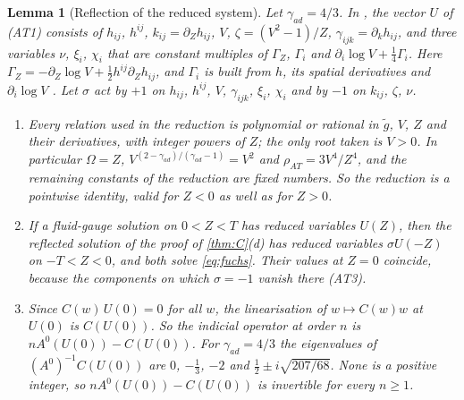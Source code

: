 \documentclass[11pt]{article}
\theoremstyle{canonmath}
\newtheorem{lemma}[theorem]{Lemma}
\theoremstyle{canonpostulate}
\theoremstyle{canonproposition}
\theoremstyle{canonmath}
\theoremstyle{canonproposition}
\def\mathrm#1{#1}%
\def\mathbf#1{#1}%
\begin{document}
\begin{lemma}[Reflection of the reduced system]\label{lem:ATreflect}
Let $\gamma_{\mathrm{ad}} = 4/3$. In \cite[§4.3]{AnguigeTod1999a}, the vector $\mathbf{U}$ of (AT1) consists of $h_{ij}$, $h^{ij}$, $k_{ij} = \partial_Zh_{ij}$, $V$, $\zeta = (V^2-1)/Z$, $\gamma_{ijk} = \partial_kh_{ij}$, and three variables $\nu$, $\xi_i$, $\chi_i$ that are constant multiples of $\Gamma_Z$, $\Gamma_i$ and $\partial_i\log V + \tfrac14\Gamma_i$. Here $\Gamma_Z = -\partial_Z\log V + \tfrac12h^{ij}\partial_Zh_{ij}$, and $\Gamma_i$ is built from $h$, its spatial derivatives and $\partial_i\log V$ \cite[(46), (47), (55)]{AnguigeTod1999a}. Let $\sigma$ act by $+1$ on $h_{ij}$, $h^{ij}$, $V$, $\gamma_{ijk}$, $\xi_i$, $\chi_i$ and by $-1$ on $k_{ij}$, $\zeta$, $\nu$.
\begin{enumerate}[label=(\roman*)]
\item Every relation used in the reduction is polynomial or rational in $\tilde g$, $V$, $Z$ and their derivatives, with integer powers of $Z$; the only root taken is $V>0$. In particular $\Omega = Z$, $V^{(2-\gamma_{\mathrm{ad}})/(\gamma_{\mathrm{ad}}-1)} = V^2$ and $\rho_{\mathrm{AT}} = 3V^4/Z^4$, and the remaining constants of the reduction are fixed numbers. So the reduction is a pointwise identity, valid for $Z<0$ as well as for $Z>0$.
\item If a fluid-gauge solution on $0<Z<T$ has reduced variables $\mathbf{U}(Z)$, then the reflected solution of the proof of \cref{thm:C}(d) has reduced variables $\sigma \mathbf{U}(-Z)$ on $-T<Z<0$, and both solve \eqref{eq:fuchs}. Their values at $Z = 0$ coincide, because the components on which $\sigma = -1$ vanish there (AT3).
\item Since $C(w)\,\mathbf{U}(0) = 0$ for all $w$, the linearisation of $w\mapsto C(w)w$ at $\mathbf{U}(0)$ is $C(\mathbf{U}(0))$. So the indicial operator at order $n$ is $nA^0(\mathbf{U}(0)) - C(\mathbf{U}(0))$. For $\gamma_{\mathrm{ad}} = 4/3$ the eigenvalues of $(A^0)^{-1}C(\mathbf{U}(0))$ are $0$, $-\tfrac13$, $-2$ and $\tfrac12\pm i\sqrt{207/68}$. None is a positive integer, so $nA^0(\mathbf{U}(0)) - C(\mathbf{U}(0))$ is invertible for every $n\ge1$.
\end{enumerate}
\end{lemma}
\end{document}
